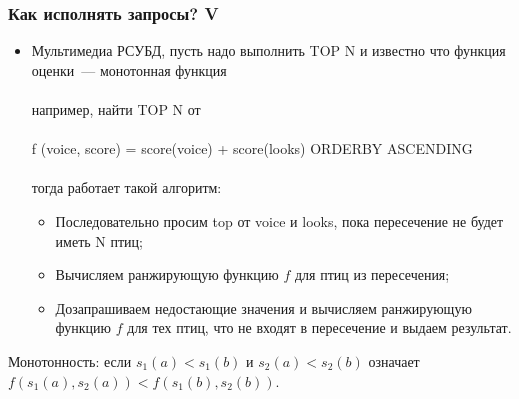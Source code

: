 \documentclass{beamer}
\begin{document}
\begin{frame}
\frametitle{Как исполнять запросы? V}

\begin{itemize}
  \setlength\itemsep{1em}

  \item Мультимедиа РСУБД, пусть надо выполнить TOP N и известно что функция оценки~--- монотонная функция\\~\\например, найти TOP N от\\~\\ f (voice, score) = score(voice) + score(looks) ORDERBY ASCENDING\\~\\
  тогда работает такой алгоритм:
  \begin{itemize}
    \item Последовательно просим top от voice и looks, пока пересечение не будет иметь N птиц;
    \item Вычисляем ранжирующую функцию $f$ для птиц из пересечения;
    \item Дозапрашиваем недостающие значения и вычисляем ранжирующую функцию $f$ для тех птиц, что не входят в пересечение и выдаем результат.
  \end{itemize}
  
\end{itemize}

Монотонность: если $s_1(a)<s_1(b)$ и $s_2(a)<s_2(b)$ означает $f(s_1(a),
s_2(a)) < f(s_1(b), s_2(b))$.

\end{frame}
\end{document}
